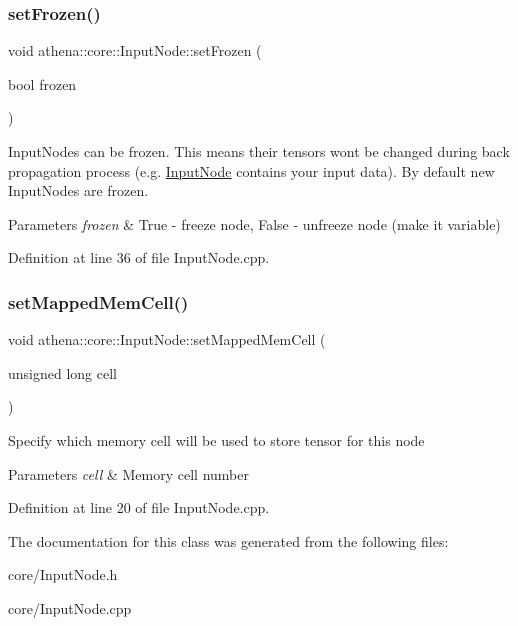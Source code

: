 \subsubsection{\texorpdfstring{set\+Frozen()}{setFrozen()}}
{\footnotesize\ttfamily void athena\+::core\+::\+Input\+Node\+::set\+Frozen (\begin{DoxyParamCaption}\item[{bool}]{frozen }\end{DoxyParamCaption})}

Input\+Nodes can be frozen. This means their tensors won\textquotesingle{}t be changed during back propagation process (e.\+g. \mbox{\hyperlink{classathena_1_1core_1_1_input_node}{Input\+Node}} contains your input data). By default new Input\+Nodes are frozen. 
\begin{DoxyParams}{Parameters}
{\em frozen} & True -\/ freeze node, False -\/ unfreeze node (make it variable) \\
\hline
\end{DoxyParams}


Definition at line 36 of file Input\+Node.\+cpp.

\mbox{\label{classathena_1_1core_1_1_input_node_a8c17ce96d989454e6316c1c049c2c98d}} 
\subsubsection{\texorpdfstring{set\+Mapped\+Mem\+Cell()}{setMappedMemCell()}}
{\footnotesize\ttfamily void athena\+::core\+::\+Input\+Node\+::set\+Mapped\+Mem\+Cell (\begin{DoxyParamCaption}\item[{unsigned long}]{cell }\end{DoxyParamCaption})}

Specify which memory cell will be used to store tensor for this node 
\begin{DoxyParams}{Parameters}
{\em cell} & Memory cell number \\
\hline
\end{DoxyParams}


Definition at line 20 of file Input\+Node.\+cpp.



The documentation for this class was generated from the following files\+:\begin{DoxyCompactItemize}
\item 
core/Input\+Node.\+h\item 
core/Input\+Node.\+cpp\end{DoxyCompactItemize}
